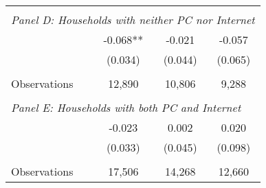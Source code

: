 {\begin{tabular}{lccc}
&  &  &   \\
\multicolumn{4}{l}{\textit{Panel D: Households with neither PC nor Internet}} \\
\hspace{3mm}        &      -0.068** &      -0.021   &      -0.057   \\
                    &     (0.034)   &     (0.044)   &     (0.065)   \\
                    &               &               &               \\
\hspace{3mm}Observations&      12,890   &      10,806   &       9,288   \\
 
&  &  &   \\
\multicolumn{4}{l}{\textit{Panel E: Households with both PC and Internet}} \\
\hspace{3mm}        &      -0.023   &       0.002   &       0.020   \\
                    &     (0.033)   &     (0.045)   &     (0.098)   \\
                    &               &               &               \\
\hspace{3mm}Observations&      17,506   &      14,268   &      12,660   \\
 

\bottomrule
\end{tabular}
}
